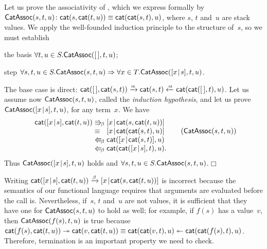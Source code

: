 Let us prove the associativity
 of , which
we express formally by \(\textsf{CatAssoc}({s,t,u}) \colon
\textsf{cat}(s,\textsf{cat}(t,u)) \equiv
\textsf{cat}(\textsf{cat}(s,t),u)\),
where \(s\), \(t\) and~\(u\) are stack values. We apply the
well\hyp{}founded induction principle to the structure of~\(s\), so we
must establish
\begin{itemize*}

  \item the basis \(\forall t,u \in S.\textsf{CatAssoc}({[\,],t,u})\);

  \item step \(\forall s,t,u \in S.\textsf{CatAssoc}({s,t,u})
    \Rightarrow \forall x \in T.\textsf{CatAssoc}({[{x}\!\mid\!{s}],t,u})\).

\end{itemize*}
The base case is direct: \(\textsf{cat}([\,],\textsf{cat}(s,t))
\xrightarrow{\smash{\alpha}} \textsf{cat}(s,t)
\xleftarrow{\smash{\alpha}}
\textsf{cat}(\textsf{cat}([\,],t),u)\). Let us assume
now \(\textsf{CatAssoc}({s,t,u})\), called the \emph{induction
  hypothesis}, and let us prove
\(\textsf{CatAssoc}({[{x}\!\mid\!{s}],t,u})\),
for any term~\(x\). We have
\begin{equation*}
\begin{array}{r@{\;}l@{\;}l@{\qquad}r@{}}
  \fun{cat}(\cons{x}{s},\fun{cat}(t,u))
& \Rra{\beta}
& \cons{x}{\fun{cat}(s,\fun{cat}(t,u))}\\
& \equiv
& \cons{x}{\fun{cat}(\fun{cat}(s,t),u)}
& (\pred{CatAssoc}{s,t,u})\\
& \Lla{\beta}
& \fun{cat}(\cons{x}{\fun{cat}(s,t)},u)\\
& \Lla{\beta}
& \fun{cat}(\fun{cat}(\cons{x}{s},t),u).\index{cat@\fun{cat/2}}
\end{array}
\end{equation*}
Thus
\(\textsf{CatAssoc}({[{x}\!\mid\!{s}],t,u})\) holds and \(\forall s,t,u \in
S.\textsf{CatAssoc}({s,t,u})\).\hfill\(\Box\)

Writing \(\textsf{cat}([{x}\!\mid\!{s}],\textsf{cat}(t,u))
\xrightarrow{\smash{\beta}} [{x}\!\mid\!{\textsf{cat}(s,\textsf{cat}(t,u))}]\) is
incorrect because the semantics of our functional language requires
that arguments are evaluated before the call is. Nevertheless,
if~\(s\), \(t\) and~\(u\) are not values, it is sufficient that they
have one for \(\textsf{CatAssoc}({s,t,u})\) to hold as well; for example,
if \(f(s)\) has a value~\(v\), then \(\textsf{CatAssoc}({f(s),t,u})\) is
true because \(\textsf{cat}(f(s),\textsf{cat}(t,u)) \twoheadrightarrow
\textsf{cat}(v,\textsf{cat}(t,u)) \equiv \textsf{cat}(\textsf{cat}(v,t),u)
\twoheadleftarrow \textsf{cat}(\textsf{cat}(f(s),t),u)\). Therefore,
termination is an important property we need to check.
 
